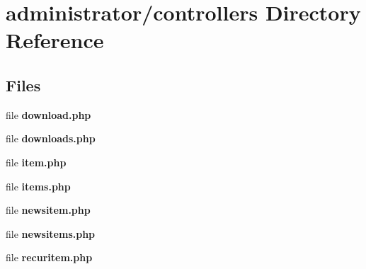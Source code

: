\section{administrator/controllers Directory Reference}
\label{dir_a26c37b75eb6de48b34c1106d79de4d7}
\subsection*{Files}
\begin{DoxyCompactItemize}
\item 
file \textbf{ download.\+php}
\item 
file \textbf{ downloads.\+php}
\item 
file \textbf{ item.\+php}
\item 
file \textbf{ items.\+php}
\item 
file \textbf{ newsitem.\+php}
\item 
file \textbf{ newsitems.\+php}
\item 
file \textbf{ recuritem.\+php}
\end{DoxyCompactItemize}
